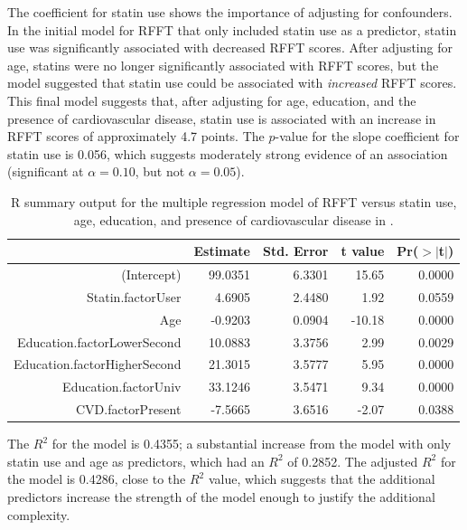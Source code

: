 The coefficient for statin use shows the importance of adjusting for confounders.  In the initial model for RFFT that only included statin use as a predictor, statin use was significantly associated with decreased RFFT scores. After adjusting for age, statins were no longer significantly associated with RFFT scores, but the model suggested that statin use could be associated with \emph{increased} RFFT scores. This final model suggests that, after adjusting for age, education, and the presence of cardiovascular disease, statin use is associated with an increase in RFFT scores of approximately 4.7 points. The $p$-value for the slope coefficient for statin use is 0.056, which suggests moderately strong evidence of an association (significant at $\alpha = 0.10$, but not $\alpha = 0.05$).

\begin{table}[ht]
\centering
\begin{tabular}{rrrrr}
  \hline
 & Estimate & Std. Error & t value & Pr($>$$|$t$|$) \\ 
  \hline
(Intercept) & 99.0351 & 6.3301 & 15.65 & 0.0000 \\ 
  Statin.factorUser & 4.6905 & 2.4480 & 1.92 & 0.0559 \\ 
  Age & -0.9203 & 0.0904 & -10.18 & 0.0000 \\ 
  Education.factorLowerSecond & 10.0883 & 3.3756 & 2.99 & 0.0029 \\ 
  Education.factorHigherSecond & 21.3015 & 3.5777 & 5.95 & 0.0000 \\ 
  Education.factorUniv & 33.1246 & 3.5471 & 9.34 & 0.0000 \\ 
  CVD.factorPresent & -7.5665 & 3.6516 & -2.07 & 0.0388 \\ 
   \hline
\end{tabular}
\caption{\textsf{R} summary output for the multiple regression model of RFFT versus statin use, age, education, and presence of cardiovascular disease in .} 
\label{prevendRFFTStatinAgeEducationCVD}
\end{table}

The $R^2$ for the model is 0.4355; a substantial increase from the model with only statin use and age as predictors, which had an $R^2$ of 0.2852. The adjusted $R^2$ for the model is 0.4286, close to the $R^2$ value, which suggests that the additional predictors increase the strength of the model enough to justify the additional complexity.

